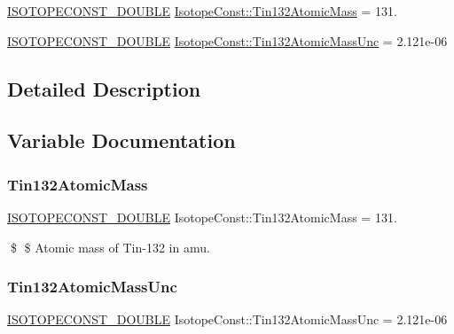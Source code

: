 \begin{DoxyCompactItemize}
\item 
\mbox{\hyperlink{group___isotope_const-_macros_ga8f45a7272ce02c0b4c65c44636ed719a}{I\+S\+O\+T\+O\+P\+E\+C\+O\+N\+S\+T\+\_\+\+D\+O\+U\+B\+LE}} \mbox{\hyperlink{group___isotope_const-_tin-_sn132_ga62a03549355f1f16461dcf8980c97472}{Isotope\+Const\+::\+Tin132\+Atomic\+Mass}} = 131.
\item 
\mbox{\hyperlink{group___isotope_const-_macros_ga8f45a7272ce02c0b4c65c44636ed719a}{I\+S\+O\+T\+O\+P\+E\+C\+O\+N\+S\+T\+\_\+\+D\+O\+U\+B\+LE}} \mbox{\hyperlink{group___isotope_const-_tin-_sn132_gaa441325bb12ab2c2d691b31c257f6a8b}{Isotope\+Const\+::\+Tin132\+Atomic\+Mass\+Unc}} = 2.\+121e-\/06
\end{DoxyCompactItemize}


\subsection{Detailed Description}


\subsection{Variable Documentation}
\mbox{\label{group___isotope_const-_tin-_sn132_ga62a03549355f1f16461dcf8980c97472}} 
\subsubsection{\texorpdfstring{Tin132\+Atomic\+Mass}{Tin132AtomicMass}}
{\footnotesize\ttfamily \mbox{\hyperlink{group___isotope_const-_macros_ga8f45a7272ce02c0b4c65c44636ed719a}{I\+S\+O\+T\+O\+P\+E\+C\+O\+N\+S\+T\+\_\+\+D\+O\+U\+B\+LE}} Isotope\+Const\+::\+Tin132\+Atomic\+Mass = 131.}

\$ \$ Atomic mass of Tin-\/132 in amu. \mbox{\label{group___isotope_const-_tin-_sn132_gaa441325bb12ab2c2d691b31c257f6a8b}} 
\subsubsection{\texorpdfstring{Tin132\+Atomic\+Mass\+Unc}{Tin132AtomicMassUnc}}
{\footnotesize\ttfamily \mbox{\hyperlink{group___isotope_const-_macros_ga8f45a7272ce02c0b4c65c44636ed719a}{I\+S\+O\+T\+O\+P\+E\+C\+O\+N\+S\+T\+\_\+\+D\+O\+U\+B\+LE}} Isotope\+Const\+::\+Tin132\+Atomic\+Mass\+Unc = 2.\+121e-\/06}

